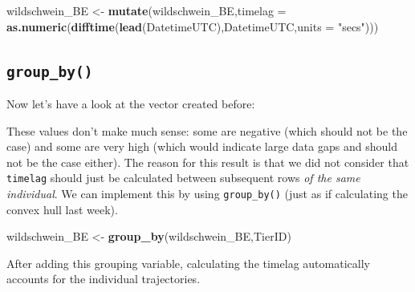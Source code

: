 \documentclass[]{book}
\newenvironment{Shaded}{\begin{snugshade}}{\end{snugshade}}
\newcommand{\KeywordTok}[1]{\textcolor[rgb]{0.13,0.29,0.53}{\textbf{#1}}}
\newcommand{\DataTypeTok}[1]{\textcolor[rgb]{0.13,0.29,0.53}{#1}}
\newcommand{\StringTok}[1]{\textcolor[rgb]{0.31,0.60,0.02}{#1}}
\newcommand{\OperatorTok}[1]{\textcolor[rgb]{0.81,0.36,0.00}{\textbf{#1}}}
\newcommand{\NormalTok}[1]{#1}
\begin{document}
\begin{Shaded}
\begin{Highlighting}[]
\NormalTok{wildschwein_BE <-}\StringTok{ }\KeywordTok{mutate}\NormalTok{(wildschwein_BE,}\DataTypeTok{timelag =} \KeywordTok{as.numeric}\NormalTok{(}\KeywordTok{difftime}\NormalTok{(}\KeywordTok{lead}\NormalTok{(DatetimeUTC),DatetimeUTC,}\DataTypeTok{units =} \StringTok{"secs"}\NormalTok{)))}
\end{Highlighting}
\end{Shaded}

\subsection{\texorpdfstring{\texttt{group\_by()}}{group\_by()}}\label{group_by}

Now let's have a look at the vector created before:

\begin{Shaded}
\end{Shaded}

These values don't make much sense: some are negative (which should not
be the case) and some are very high (which would indicate large data
gaps and should not be the case either). The reason for this result is
that we did not consider that \texttt{timelag} should just be calculated
between subsequent rows \emph{of the same individual}. We can implement
this by using \texttt{group\_by()} (just as if calculating the convex
hull last week).

\begin{Shaded}
\begin{Highlighting}[]
\NormalTok{wildschwein_BE <-}\StringTok{ }\KeywordTok{group_by}\NormalTok{(wildschwein_BE,TierID)}
\end{Highlighting}
\end{Shaded}

After adding this grouping variable, calculating the timelag
automatically accounts for the individual trajectories.

\begin{Shaded}
\end{Shaded}
\end{document}
